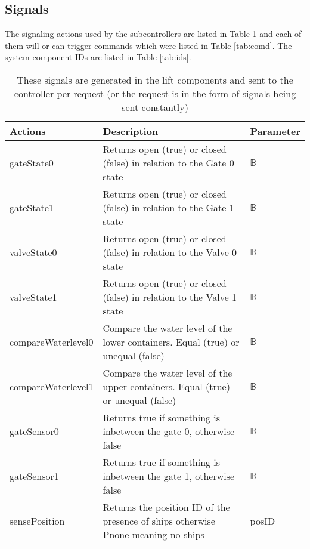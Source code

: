 \subsection{Signals}

The signaling actions used by the subcontrollers are listed in Table \ref{tab:action} and each of them will or can trigger commands which were listed in Table \ref{tab:comd}. The system component IDs are listed in Table \ref{tab:ids}. 
\begin{table}[htbp]
	\centering
	\begin{tabular}{lp{9cm}l}
		\toprule
		\textbf{Actions} & \textbf{Description} & \textbf{Parameter} \\
		\hline
		gateState0 & Returns open (true) or closed (false) in relation to the Gate 0 state &  $ \mathbb{B} $ \\
		gateState1 & Returns open (true) or closed (false) in relation to the Gate 1 state &  $ \mathbb{B} $ \\
		valveState0 & Returns open (true) or closed (false) in relation to the Valve 0 state &  $ \mathbb{B} $ \\
		valveState1 & Returns open (true) or closed (false) in relation to the Valve 1 state &  $ \mathbb{B} $ \\
		compareWaterlevel0 & Compare the water level of the lower containers. Equal (true) or unequal (false) &  $ \mathbb{B} $ \\
		compareWaterlevel1 & Compare the water level of the upper containers. Equal (true) or unequal (false) &  $ \mathbb{B} $ \\
		gateSensor0 &  Returns true if something is inbetween the gate 0, otherwise false &  $ \mathbb{B} $ \\
		gateSensor1 &  Returns true if something is inbetween the gate 1, otherwise false &  $ \mathbb{B} $ \\
		sensePosition  & Returns the position ID of the presence of ships otherwise Pnone meaning no ships & posID \\
		\bottomrule
	\end{tabular}%
	\caption{These signals are generated in the lift components and sent to the controller per request (or the request is in the form of signals being sent constantly)}
	\label{tab:action}%
\end{table}%

